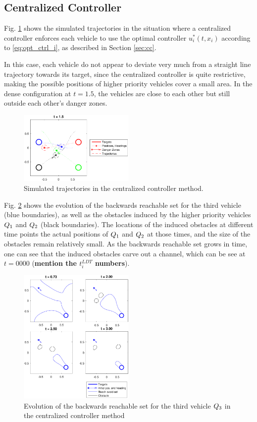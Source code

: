 \subsection{Centralized Controller}
Fig. \ref{fig:cc_traj} shows the simulated trajectories in the situation where a centralized controller enforces each vehicle to use the optimal controller $u^*_i(t, x_i)$ according to \eqref{eq:opt_ctrl_i}, as described in Section \ref{sec:cc}.

In this case, each vehicle do not appear to deviate very much from a straight line trajectory towards its target, since the centralized controller is quite restrictive, making the possible positions of higher priority vehicles cover a small area. In the dense configuration at $t=1.5$, the vehicles are close to each other but still outside each other's danger zones.

\begin{figure}
  \centering
  \includegraphics[width=0.5\textwidth]{"fig/cc_traj"}
  \caption{Simulated trajectories in the centralized controller method.}
  \label{fig:cc_traj}
\end{figure}

Fig. \ref{fig:cc_rs3} shows the evolution of the backwards reachable set for the third vehicle (blue boundaries), as well as the obstacles induced by the higher priority vehicles $Q_1$ and $Q_2$ (black boundaries). The locations of the induced obstacles at different time points the actual positions of $Q_1$ and $Q_2$ at those times, and the size of the obstacles remain relatively small. As the backwards reachable set grows in time, one can see that the induced obstacles carve out a channel, which can be see at $t = 0000$ (\textbf{mention the $t_i^{LDT}$ numbers}).

\begin{figure}
  \centering
  \includegraphics[width=0.5\textwidth]{"fig/cc_rs3"}
  \caption{Evolution of the backwards reachable set for the third vehicle $Q_3$ in the centralized controller method}
  \label{fig:cc_rs3}
\end{figure}

